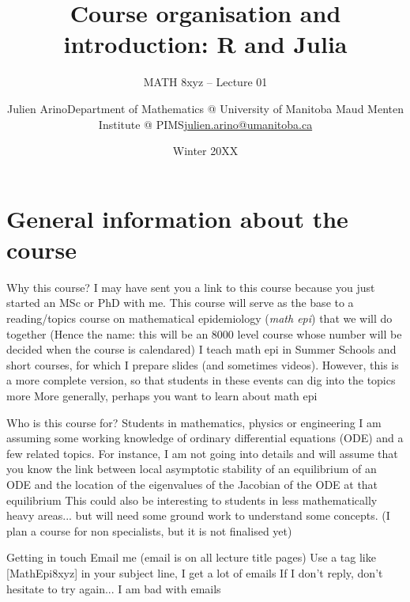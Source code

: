 \documentclass[aspectratio=169]{beamer}\usepackage[]{graphicx}\usepackage[]{xcolor}
\subtitle{MATH 8xyz -- Lecture 01}
\author{\texorpdfstring{Julien Arino\newline Department of Mathematics @ University of Manitoba \newline Maud Menten Institute @ PIMS\newline\url{julien.arino@umanitoba.ca}}{Julien Arino}}
\date{Winter 20XX}
\title{Course organisation and introduction: R and Julia}
\begin{document}

\section{General information about the course}

\begin{frame}{Why this course?}
\bbullet I may have sent you a link to this course because you just started an MSc or PhD with me. This course will serve as the base to a reading/topics course on mathematical epidemiology (\emph{math epi}) that we will do together
\vfill
(Hence the name: this will be an 8000 level course whose number will be decided when the course is calendared)
\vfill
\bbullet I teach math epi in Summer Schools and short courses, for which I prepare slides (and sometimes videos). However, this is a more complete version, so that students in these events can dig into the topics more
\vfill
\bbullet More generally, perhaps you want to learn about math epi
\end{frame}

\begin{frame}{Who is this course for?}
\bbullet Students in mathematics, physics or engineering
\vfill
\bbullet I am assuming some working knowledge of ordinary differential equations (ODE) and a few related topics. For instance, I am not going into details and will assume that you know the link between local asymptotic stability of an equilibrium of an ODE and the location of the eigenvalues of the Jacobian of the ODE at that equilibrium
\vfill
\bbullet This could also be interesting to students in less mathematically heavy areas... but will need some ground work to understand some concepts. (I plan a course for non specialists, but it is not finalised yet)
\end{frame}

\begin{frame}{Getting in touch}
Email me (email is on all lecture title pages)
\vfill
Use a tag like [MathEpi8xyz] in your subject line, I get a lot of emails
\vfill
If I don't reply, don't hesitate to try again... I am bad with emails
\end{frame} 
\end{document}
